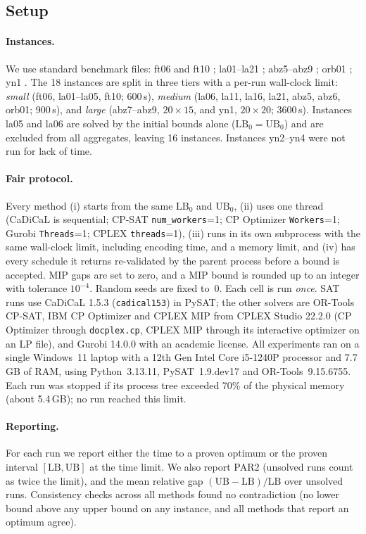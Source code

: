 \documentclass[a4paper,fleqn]{cas-sc}
\begin{document}
\subsection{Setup}
\paragraph{Instances.}
We use standard benchmark files: ft06 and ft10 \citep{fisher1963}; la01--la21 \citep{lawrence1984}; abz5--abz9 \citep{adams1988}; orb01 \citep{applegate1991}; yn1 \citep{yamada1992}.
The 18 instances are split in three tiers with a per-run wall-clock limit:
\emph{small} (ft06, la01--la05, ft10; 600\,s),
\emph{medium} (la06, la11, la16, la21, abz5, abz6, orb01; 900\,s), and
\emph{large} (abz7--abz9, $20\times15$, and yn1, $20\times20$; 3600\,s).
Instances la05 and la06 are solved by the initial bounds alone ($\mathrm{LB}_0=\mathrm{UB}_0$) and are excluded from all aggregates, leaving 16 instances.
Instances yn2--yn4 were not run for lack of time.

\paragraph{Fair protocol.}
Every method (i) starts from the same $\mathrm{LB}_0$ and $\mathrm{UB}_0$, (ii) uses one thread (CaDiCaL is sequential; CP-SAT \texttt{num\_workers}=1; CP Optimizer \texttt{Workers}=1; Gurobi \texttt{Threads}=1; CPLEX \texttt{threads}=1), (iii) runs in its own subprocess with the same wall-clock limit, including encoding time, and a memory limit, and (iv) has every schedule it returns re-validated by the parent process before a bound is accepted.
MIP gaps are set to zero, and a MIP bound is rounded up to an integer with tolerance $10^{-4}$.
Random seeds are fixed to~0.
Each cell is run \emph{once}.
SAT runs use CaDiCaL 1.5.3 (\texttt{cadical153}) in PySAT; the other solvers are OR-Tools CP-SAT, IBM CP Optimizer and CPLEX MIP from CPLEX Studio 22.2.0 (CP Optimizer through \texttt{docplex.cp}, CPLEX MIP through its interactive optimizer on an LP file), and Gurobi 14.0.0 with an academic license.
All experiments ran on a single Windows~11 laptop with a 12th Gen Intel Core i5-1240P processor and 7.7\,GB of RAM, using Python~3.13.11, PySAT~1.9.dev17 and OR-Tools~9.15.6755. Each run was stopped if its process tree exceeded 70\% of the physical memory (about 5.4\,GB); no run reached this limit.

\paragraph{Reporting.}
For each run we report either the time to a proven optimum or the proven interval $[\mathrm{LB},\mathrm{UB}]$ at the time limit.
We also report PAR2 (unsolved runs count as twice the limit), and the mean relative gap $(\mathrm{UB}-\mathrm{LB})/\mathrm{LB}$ over unsolved runs.
Consistency checks across all methods found no contradiction (no lower bound above any upper bound on any instance, and all methods that report an optimum agree).
\end{document}
